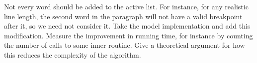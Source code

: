Not every word should be added to the active list. For instance, for
any realistic line length, the second word in the paragraph will not
have a valid breakpoint after it, so we need not consider it.  Take
the model implementation and add this modification. Measure the
improvement in running time, for instance by counting the number of
calls to some inner routine.  Give a theoretical argument for how this
reduces the complexity of the algorithm.
